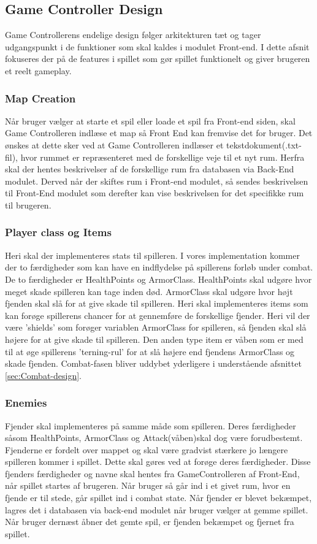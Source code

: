 \subsection{Game Controller Design}
Game Controllerens endelige design følger arkitekturen tæt og tager udgangspunkt i de funktioner som skal kaldes i modulet Front-end. I dette afsnit fokuseres der på de features i spillet som gør spillet funktionelt og giver brugeren et reelt gameplay.

\subsubsection{Map Creation}
Når bruger vælger at starte et spil eller loade et spil fra Front-end siden, skal Game Controlleren indlæse et map så Front End kan fremvise det for bruger. Det ønskes at dette sker ved at Game Controlleren indlæser et tekstdokument(.txt-fil), hvor rummet er repræsenteret med de forskellige veje til et nyt rum. Herfra skal der hentes beskrivelser af de forskellige rum fra databasen via Back-End modulet. Derved når der skiftes rum i Front-end modulet, så sendes beskrivelsen til Front-End modulet som derefter kan vise beskrivelsen for det specifikke rum til brugeren.

\subsubsection{Player class og Items}
\label{sec:Player class og Items}
Heri skal der implementeres stats til spilleren. I vores implementation kommer der to færdigheder som kan have en indflydelse på spillerens forløb under combat. De to færdigheder er HealthPoints og ArmorClass. HealthPoints skal udgøre hvor meget skade spilleren kan tage inden død. ArmorClass skal udgøre hvor højt fjenden skal slå for at give skade til spilleren. Heri skal implementeres items som kan forøge spillerens chancer for at gennemføre de forskellige fjender. Heri vil der være 'shields' som forøger variablen ArmorClass for spilleren, så fjenden skal slå højere for at give skade til spilleren. Den anden type item er våben som er med til at øge spillerens 'terning-rul' for at slå højere end fjendens ArmorClass og skade fjenden. Combat-fasen bliver uddybet yderligere i understående afsnittet \autoref{sec:Combat-design}.

\subsubsection{Enemies}
Fjender skal implementeres på samme måde som spilleren. Deres færdigheder såsom HealthPoints, ArmorClass og Attack(våben)skal dog være forudbestemt. Fjenderne er fordelt over mappet og skal være gradvist stærkere jo længere spilleren kommer i spillet. Dette skal gøres ved at forøge deres færdigheder. Disse fjenders færdigheder og navne skal hentes fra GameControlleren af Front-End, når spillet startes af brugeren. Når bruger så går ind i et givet rum, hvor en fjende er til stede, går spillet ind i combat state. Når fjender er blevet bekæmpet, lagres det i databasen via back-end modulet når bruger vælger at gemme spillet. Når bruger dernæst åbner det gemte spil, er fjenden bekæmpet og fjernet fra spillet.
